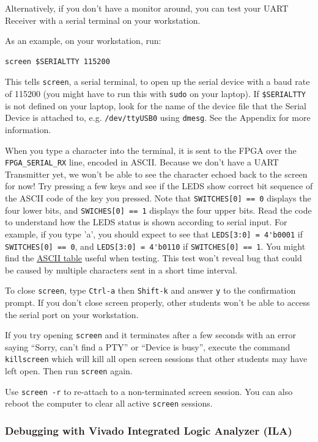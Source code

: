 \documentclass[11pt]{article}
\begin{document}
Alternatively, if you don't have a monitor around, you can test your UART Receiver with a serial terminal on your workstation.

As an example, on your workstation, run:

\begin{verbatim}
screen $SERIALTTY 115200
\end{verbatim}

This tells \verb|screen|, a serial terminal, to open up the serial device with a baud rate of 115200 (you might have to run this with \verb|sudo| on your laptop). If \verb|$SERIALTTY| is not defined on your laptop, look for the name of the device file that the Serial Device is attached to, e.g. \verb|/dev/ttyUSB0| using \texttt{dmesg}. See the Appendix for more information.

When you type a character into the terminal, it is sent to the FPGA over the \verb|FPGA_SERIAL_RX| line, encoded in ASCII. Because we don't have a UART Transmitter yet, we won't be able to see the character echoed back to the screen for now! Try pressing a few keys and see if the LEDS show correct bit sequence of the ASCII code of the key you pressed. Note that \verb|SWITCHES[0] == 0| displays the four lower bits, and \verb|SWICHES[0] == 1| displays the four upper bits. 
Read the code to understand how the LEDS status is shown according to serial input.
For example, if you type 'a', you should expect to see that \verb|LEDS[3:0] = 4'b0001| if \verb|SWITCHES[0] == 0|, and \verb|LEDS[3:0] = 4'b0110| if \verb|SWITCHES[0] == 1|. You might find the \href{http://www.asciitable.com/}{ASCII table} useful when testing.
This test won't reveal bug that could be caused by multiple characters sent in a short time interval.

To close \verb|screen|, type \verb|Ctrl-a| then \verb|Shift-k| and answer \verb|y| to the confirmation prompt.
If you don't close screen properly, other students won't be able to access the serial port on your workstation.

If you try opening \verb|screen| and it terminates after a few seconds with an error saying ``Sorry, can't find a PTY'' or ``Device is busy'', execute the command \verb|killscreen| which will kill all open screen sessions that other students may have left open.
Then run \verb|screen| again.

Use \verb|screen -r| to re-attach to a non-terminated screen session. You can also reboot the computer to clear all active \verb|screen| sessions.

\subsubsection{Debugging with Vivado Integrated Logic Analyzer (ILA)}
\end{document}
